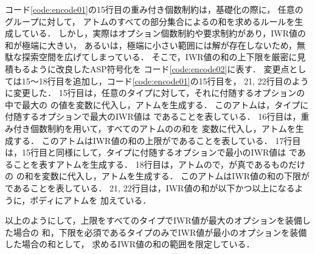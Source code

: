 コード\ref{code:encode01}の15行目の重み付き個数制約は，基礎化の際に，
任意のグループに対して，
アトムのすべての部分集合によるの和を求めるルールを生成している．
しかし，実際はオプション個数制約や要求制約があり，IWR値の和が極端に大きい，
あるいは，極端に小さい範囲には解が存在しないため，無駄な探索空間を広げてしまっている．
そこで，IWR値の和の上下限を厳密に見積もるように改良したASP符号化を
コード\ref{code:encode02}に表す．
変更点としては15〜18行目を追加し，コード\ref{code:encode01}の15行目を，
21, 22行目のように変更した．
%
15行目は，任意のタイプに対して，それに付随するオプションの中で最大の
の値を変数に代入し，アトムを生成する．
このアトムは，タイプに付随するオプションで最大のIWR値は
であることを表している．
%
16行目は，重み付き個数制約を用いて，すべてのアトムのの和を
変数に代入し，アトムを生成する．
このアトムはIWR値の和の上限がであることを表している．
%
17行目は，15行目と同様にして，タイプに付随するオプションで最小のIWR値は
であることを表すアトムを生成する．
%
18行目は，アトムので，が真であるものだけの
の和を変数に代入し，アトムを生成する．
このアトムはIWR値の和の下限がであることを表している．
%
21, 22行目は，IWR値の和が以下かつ以上になるように，ボディにアトムを
加えている．
%

以上のようにして，上限をすべてのタイプでIWR値が最大のオプションを装備した場合の
和，下限を必須であるタイプのみでIWR値が最小のオプションを装備した場合の和として，
求めるIWR値の和の範囲を限定している．




